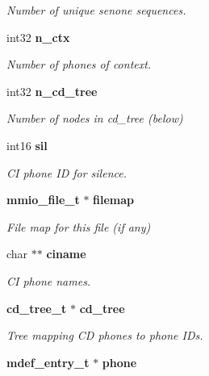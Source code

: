 \begin{DoxyCompactItemize}
\begin{DoxyCompactList}\small\item\em Number of unique senone sequences. \end{DoxyCompactList}\item 
int32 {\bf n\-\_\-ctx}\label{structbin__mdef__s_a31b5cda5136c6f72816da8889719bfe2}

\begin{DoxyCompactList}\small\item\em Number of phones of context. \end{DoxyCompactList}\item 
int32 {\bf n\-\_\-cd\-\_\-tree}\label{structbin__mdef__s_ad625c3c55d5f42ed275b8b5638a6d80b}

\begin{DoxyCompactList}\small\item\em Number of nodes in cd\-\_\-tree (below) \end{DoxyCompactList}\item 
int16 {\bf sil}\label{structbin__mdef__s_a9071b7698132c1c2ce92a6f742e1c82f}

\begin{DoxyCompactList}\small\item\em C\-I phone I\-D for silence. \end{DoxyCompactList}\item 
{\bf mmio\-\_\-file\-\_\-t} $\ast$ {\bf filemap}\label{structbin__mdef__s_a3358a80c50bf3f62417596553adf9c5e}

\begin{DoxyCompactList}\small\item\em File map for this file (if any) \end{DoxyCompactList}\item 
char $\ast$$\ast$ {\bf ciname}\label{structbin__mdef__s_afdd0df913746b0656186fc8c3e8a9206}

\begin{DoxyCompactList}\small\item\em C\-I phone names. \end{DoxyCompactList}\item 
{\bf cd\-\_\-tree\-\_\-t} $\ast$ {\bf cd\-\_\-tree}\label{structbin__mdef__s_a0642be2bb56149689ad3fc1dad1e5d55}

\begin{DoxyCompactList}\small\item\em Tree mapping C\-D phones to phone I\-Ds. \end{DoxyCompactList}\item 
{\bf mdef\-\_\-entry\-\_\-t} $\ast$ {\bf phone}\label{structbin__mdef__s_a2c73ae900d198460a30bce4f641d8398}


\end{DoxyCompactItemize}
